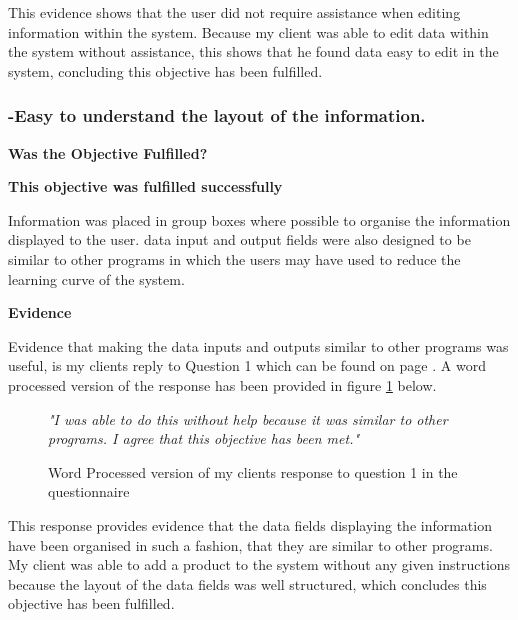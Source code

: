 This evidence shows that the user did not require assistance when editing information within the system. Because my client was able to edit data within the system without assistance, this shows that he found data easy to edit in the system, concluding this objective has been fulfilled.






\pagebreak
\subsubsection{-Easy to understand the layout of the information.}
\textbf{Was the Objective Fulfilled?} \newline

\textbf{\large{This objective was fulfilled successfully}}

Information was placed in group boxes where possible to organise the information displayed to the user. data input and output fields were also designed to be similar to other programs in which the users may have used to reduce the learning curve of the system. 


\textbf{Evidence} \newline

Evidence that making the data inputs and outputs similar to other programs was useful, is my clients reply to Question 1 which can be found on page \pageref{Client-Q1}. A word processed version of the response has been provided in figure \ref{client-evidence-Q1} below. \newline

\begin{figure}[H]
\caption{Word Processed version of my clients response to question 1 in the questionnaire} \label{client-evidence-Q1}
\vspace{3mm}
\textit{\large{"I was able to do this without help because it was similar to other programs. I agree that this objective has been met."}}
\vspace{3mm}
\end{figure}

This response provides evidence that the data fields displaying the information have been organised in such a fashion, that they are similar to other programs. My client was able to add a product to the system without any given instructions because the layout of the data fields was well structured, which concludes this objective has been fulfilled.



\pagebreak
\label{search}
